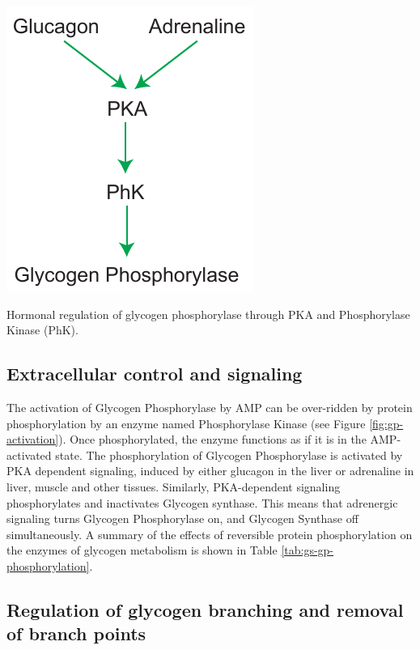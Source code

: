 \documentclass{tufte-handout}
\begin{document}
\begin{marginfigure}
\includegraphics{figures/gp-activation.pdf}
\caption{Hormonal regulation of glycogen phosphorylase through PKA and Phosphorylase Kinase (PhK).}
\label{fig:gp-activation}
\end{marginfigure}

\subsection{Extracellular control and signaling}

The activation of Glycogen Phosphorylase by AMP can be over-ridden by protein phosphorylation by an enzyme named Phosphorylase Kinase (see Figure \ref{fig:gp-activation}).  Once phosphorylated, the enzyme functions as if it is in the AMP-activated state.  The phosphorylation of Glycogen Phosphorylase is activated by PKA dependent signaling, induced by either glucagon in the liver or adrenaline in liver, muscle and other tissues.  Similarly, PKA-dependent signaling phosphorylates and inactivates Glycogen synthase.  This means that adrenergic signaling turns Glycogen Phosphorylase on, and Glycogen Synthase off simultaneously.  A summary of the effects of reversible protein phosphorylation on the enzymes of glycogen metabolism is shown in Table \ref{tab:gs-gp-phosphorylation}.

\subsection{Regulation of glycogen branching and removal of branch points}
\end{document}
